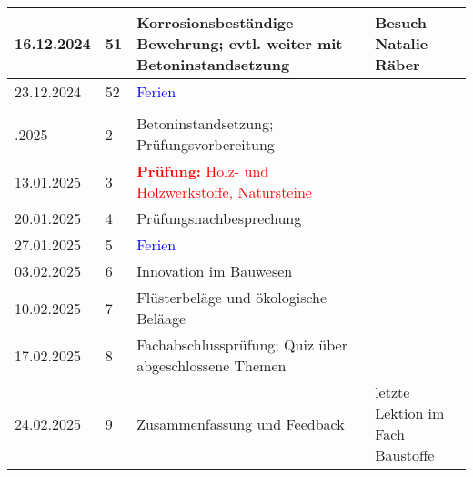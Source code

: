 \documentclass[
11pt,
captions=tableheading,
headings=big,
headsepline,
footsepline, 
captions=tableheading,
parskip=half-,
]{scrartcl}
\newcommand{\red}[1]{\textcolor{red}{#1}}
\begin{document}
\begin{table}[H]
\begin{tabular}{llp{8.5cm}p{3.5cm}}
        16.12.2024     & 51          & Korrosionsbeständige Bewehrung; evtl. weiter mit Betoninstandsetzung           & Besuch Natalie Räber             \\
        \midrule
        23.12.2024     & 52          & \textcolor{blue}{Ferien}                                                       & {}                               \\
        \midrule
        \\ \addlinespace
        \midrule
        06.01.2025     & 2           & Betoninstandsetzung; Prüfungsvorbereitung                                      & {}                               \\
        13.01.2025     & 3           & \red{\textbf{Prüfung:} Holz- und Holzwerkstoffe, Natursteine}                  & {}                               \\
        20.01.2025     & 4           & Prüfungsnachbesprechung                                                        & {}                               \\
        \midrule
        27.01.2025     & 5           & \textcolor{blue}{Ferien}                                                       & {}                               \\
        \midrule
        03.02.2025     & 6           & Innovation im Bauwesen                                                         & {}                               \\
        10.02.2025     & 7           & Flüsterbeläge  und ökologische Beläage                                                               & {}                               \\
        17.02.2025     & 8           & Fachabschlussprüfung; Quiz über abgeschlossene Themen                    & {}                               \\
        24.02.2025     & 9           & Zusammenfassung und Feedback                                                   & letzte Lektion im Fach Baustoffe \\
        \bottomrule
    \end{tabular}
\end{table}
\end{document}
